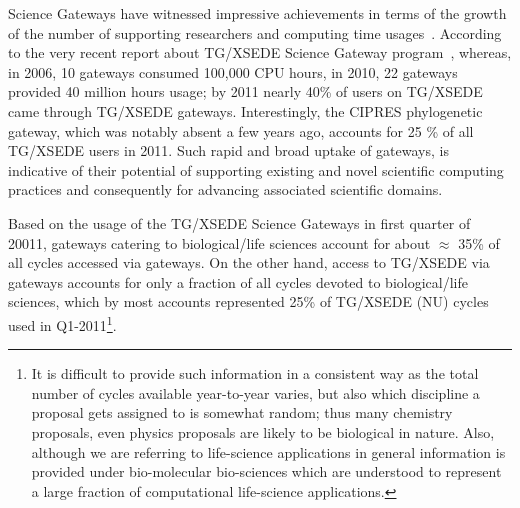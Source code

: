 \documentclass[]{svjour3}
\begin{document}




Science Gateways have witnessed impressive achievements in terms of
the growth of the number of supporting researchers and computing time
usages~\cite{gce11-nancy}. According to the very recent report about
TG/XSEDE Science Gateway program~\cite{gce11-nancy}, whereas, in 2006,
10 gateways consumed 100,000 CPU hours, in 2010, 22 gateways provided
40 million hours usage; by 2011 nearly 40\% of users on TG/XSEDE came
through TG/XSEDE gateways. Interestingly, the CIPRES phylogenetic
gateway, which was notably absent a few years ago, accounts for 25 \%
of all TG/XSEDE users in 2011. Such rapid and broad uptake of
gateways, is indicative of their potential of supporting existing and
novel scientific computing practices and consequently for advancing
associated scientific domains.

 


Based on the usage of the TG/XSEDE Science Gateways in first quarter
of 20011, gateways catering to biological/life sciences account for
about $\approx$ 35\% of all cycles accessed via gateways.  On the
other hand, access to TG/XSEDE via gateways accounts for only a
fraction of all cycles devoted to biological/life sciences, which by
most accounts represented 25\% of TG/XSEDE (NU) cycles used in
Q1-2011\footnote{It is difficult to provide such information in a
  consistent way as the total number of cycles available year-to-year
  varies, but also which discipline a proposal gets assigned to is
  somewhat random; thus many chemistry proposals, even physics
  proposals are likely to be biological in nature. Also, although we
  are referring to life-science applications in general information is
  provided under bio-molecular bio-sciences which are understood to
  represent a large fraction of computational life-science
  applications.}.  
\end{document}
